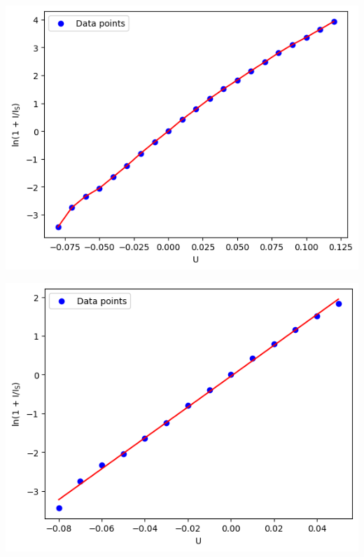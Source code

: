 \documentclass[a4paper, 14pt]{extarticle}
\begin{document}
\vfill

\newpage

\begin{center}
    \includegraphics[width=1\textwidth]{2}
\end{center}

\begin{center}
  \includegraphics[width=1\textwidth]{3}
\end{center}
\end{document}
